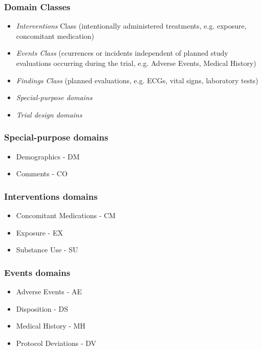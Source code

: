 \documentclass{beamer}
\begin{document}

\begin{frame}
  \frametitle{Domain Classes}
  \begin{itemize}
  	\item \emph{Interventions} Class (intentionally administered treatments, e.g. exposure, concomitant medication)
  	\item \emph{Events Class} (ccurrences or incidents independent of planned study
			evaluations occurring during the trial, e.g. Adverse Events, Medical History)
	\item \emph{Findings Class} (planned evaluations, e.g. ECGs, vital signs, laboratory tests) 
	\item \emph{Special-purpose domains}
	\item \emph{Trial design domains}
  \end{itemize}
\end{frame}

\begin{frame}
  \frametitle{Special-purpose domains}
  \begin{itemize}
	\item Demographics - DM 
	\item Comments - CO 
  \end{itemize}
\end{frame}

\begin{frame}
  \frametitle{Interventions domains}
  \begin{itemize}
	\item Concomitant Medications - CM 
	\item Exposure - EX 
	\item Substance Use - SU 
  \end{itemize}
\end{frame}

\begin{frame}
  \frametitle{Events domains}
  \begin{itemize}
	\item Adverse Events - AE 
	\item Disposition - DS 
	\item Medical History - MH 
	\item Protocol Deviations - DV 
  \end{itemize}
\end{frame}
\end{document}
